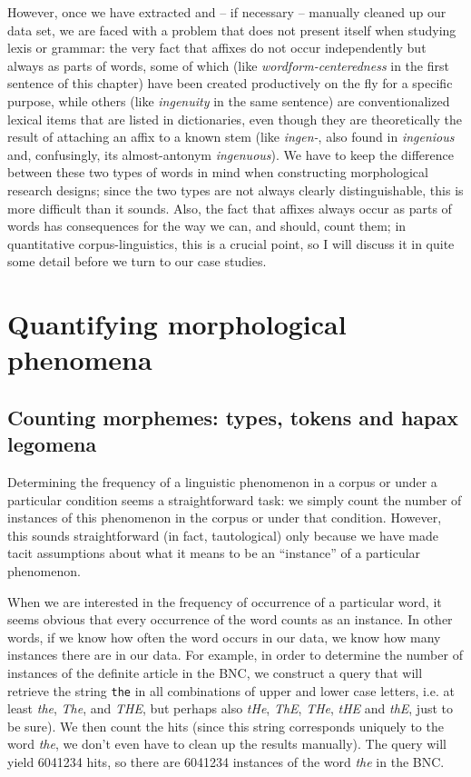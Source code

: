 However, once we have extracted and -- if necessary -- manually cleaned up our data set, we are faced with a problem that does not present itself when studying lexis or grammar: the very fact that affixes do not occur independently but always as parts of words, some of which (like \textit{wordform-centeredness} in the first sentence of this chapter) have been created productively on the fly for a specific purpose, while others (like \textit{ingenuity} in the same sentence) are conventionalized lexical items that are listed in dictionaries, even though they are theoretically the result of attaching an affix to a known stem (like \textit{ingen-}, also found in \textit{ingenious} and, confusingly, its almost-antonym \textit{ingenuous}). We have to keep the difference between these two types of words in mind when constructing morphological research designs; since the two types are not always clearly distinguishable, this is more difficult than it sounds. Also, the fact that affixes always occur as parts of words has consequences for the way we can, and should, count them; in quantitative corpus-linguistics, this is a crucial point, so I will discuss it in quite some detail before we turn to our case studies.

\section{Quantifying morphological phenomena}
\label{sec:quantifyingmorphologicalphenomena}

\subsection{Counting morphemes: types, tokens and hapax legomena}
\label{sec:countingmorphemes}

Determining the frequency of a linguistic phenomenon in a corpus or under a particular condition seems a straightforward task: we simply count the number of instances of this phenomenon in the corpus or under that condition. However, this sounds straightforward (in fact, tautological) only because we have made tacit assumptions about what it means to be an ``instance'' of a particular phenomenon.

When we are interested in the frequency of occurrence of a particular word, it seems obvious that every occurrence of the word counts as an instance. In other words, if we know how often the word occurs in our data, we know how many instances there are in our data. For example, in order to determine the number of instances of the definite article in the BNC, we construct a query that will retrieve the string \texttt{the} in all combinations of upper and lower case letters, i.e. at least \textit{the}, \textit{The}, and \textit{THE}, but perhaps also \textit{tHe}, \textit{ThE}, \textit{THe}, \textit{tHE} and \textit{thE}, just to be sure). We then count the hits (since this string corresponds uniquely to the word \textit{the}, we don't even have to clean up the results manually). The query will yield \num{6041234} hits, so there are \num{6041234} instances of the word \textit{the} in the BNC.

